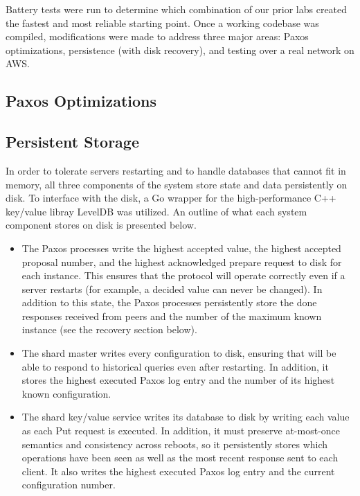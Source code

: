 \documentclass[letterpaper,10pt]{article}
\begin{document}
Battery tests were run to determine which combination of our prior labs created the fastest and most reliable starting point.  Once a working codebase was compiled, modifications were made to address three  major areas: Paxos optimizations, persistence (with disk recovery), and testing over a real network on AWS.

\subsection{Paxos Optimizations}

\subsection{Persistent Storage}
In order to tolerate servers restarting and to handle databases that cannot fit in memory, all three components of the system store state and data persistently on disk.  To interface with the disk, a Go wrapper for the high-performance C++ key/value libray LevelDB was utilized.  An outline of what each system component stores on disk is presented below.
\begin{itemize}
\item The Paxos processes write the highest accepted value, the highest accepted proposal number, and the highest acknowledged prepare request to disk for each instance.  This ensures that the protocol will operate correctly even if a server restarts (for example, a decided value can never be changed).  In addition to this state, the Paxos processes persistently store the done responses received from peers and the number of the maximum known instance (see the recovery section below).

\item The shard master writes every configuration to disk, ensuring that will be able to respond to historical queries even after restarting.  In addition, it stores the highest executed Paxos log entry and the number of its highest known configuration. 

\item The shard key/value service writes its database to disk by writing each value as each Put request is executed.  In addition, it must preserve at-most-once semantics and consistency across reboots, so it persistently stores which operations have been seen as well as the most recent response sent to each client.  It also writes the highest executed Paxos log entry and the current configuration number.
\end{itemize}
\end{document}
